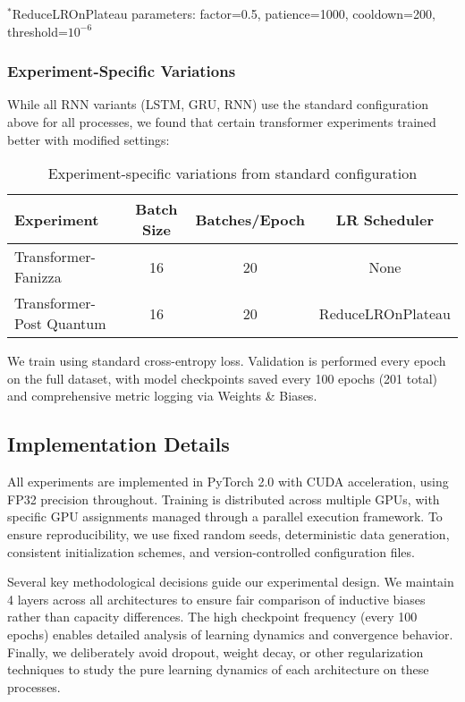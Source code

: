 \noindent $^*$ReduceLROnPlateau parameters: factor=0.5, patience=1000, cooldown=200, threshold=$10^{-6}$

\subsubsection{Experiment-Specific Variations}

While all RNN variants (LSTM, GRU, RNN) use the standard configuration above for all processes, we found that certain transformer experiments trained better with modified settings:

\begin{table}[h]
\centering
\caption{Experiment-specific variations from standard configuration}
\label{tab:variations}
\begin{tabular}{lccc}
\toprule
\textbf{Experiment} & \textbf{Batch Size} & \textbf{Batches/Epoch} & \textbf{LR Scheduler} \\
\midrule
Transformer-Fanizza & 16 & 20 & None \\
Transformer-Post Quantum & 16 & 20 & ReduceLROnPlateau \\
\bottomrule
\end{tabular}
\end{table}

We train using standard cross-entropy loss. Validation is performed every epoch on the full dataset, with model checkpoints saved every 100 epochs (201 total) and comprehensive metric logging via Weights \& Biases.

\subsection{Implementation Details}

All experiments are implemented in PyTorch 2.0 with CUDA acceleration, using FP32 precision throughout. Training is distributed across multiple GPUs, with specific GPU assignments managed through a parallel execution framework. To ensure reproducibility, we use fixed random seeds, deterministic data generation, consistent initialization schemes, and version-controlled configuration files.

Several key methodological decisions guide our experimental design. We maintain 4 layers across all architectures to ensure fair comparison of inductive biases rather than capacity differences. The high checkpoint frequency (every 100 epochs) enables detailed analysis of learning dynamics and convergence behavior. Finally, we deliberately avoid dropout, weight decay, or other regularization techniques to study the pure learning dynamics of each architecture on these processes.